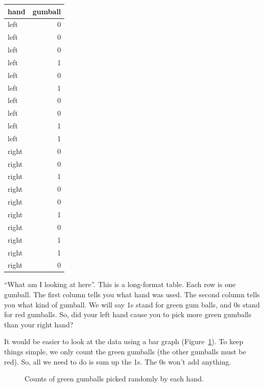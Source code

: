 \documentclass[
  letterpaper,
  DIV=11,
  numbers=noendperiod]{scrreprt}
\begin{document}
\begin{longtable}[]{@{}lr@{}}
\toprule\noalign{}
hand & gumball \\
\midrule\noalign{}
\endhead
\bottomrule\noalign{}
\endlastfoot
left & 0 \\
left & 0 \\
left & 0 \\
left & 1 \\
left & 0 \\
left & 1 \\
left & 0 \\
left & 0 \\
left & 1 \\
left & 1 \\
right & 0 \\
right & 0 \\
right & 1 \\
right & 0 \\
right & 0 \\
right & 1 \\
right & 0 \\
right & 1 \\
right & 1 \\
right & 0 \\
\end{longtable}

``What am I looking at here''. This is a long-format table. Each row is
one gumball. The first column tells you what hand was used. The second
column tells you what kind of gumball. We will say 1s stand for green
gum balls, and 0s stand for red gumballs. So, did your left hand cause
you to pick more green gumballs than your right hand?

It would be easier to look at the data using a bar graph
(Figure~\ref{fig-5gumballA}). To keep things simple, we only count the
green gumballs (the other gumballs must be red). So, all we need to do
is sum up the 1s. The 0s won't add anything.

\begin{figure}


\caption{\label{fig-5gumballA}Counts of green gumballs picked randomly
by each hand.}

\end{figure}%
\end{document}

